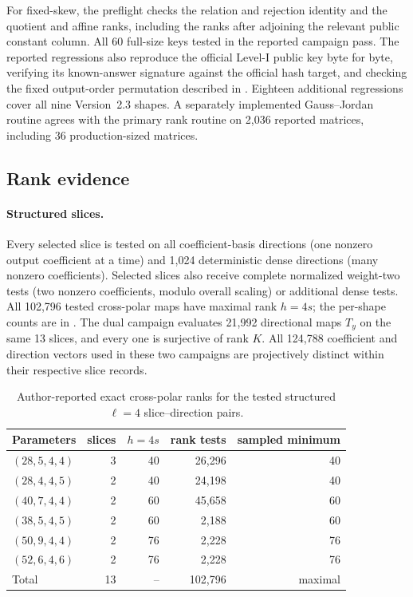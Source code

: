 \documentclass[11pt]{article}
\begin{document}
For fixed-skew, the preflight checks the relation and rejection identity and
the quotient and affine ranks, including the ranks after adjoining the
relevant public constant column.  All 60 full-size keys tested in the reported
campaign pass.  The
reported regressions also reproduce the official
Level-I public key byte for byte,
verifying its known-answer signature against the official hash target, and
checking the fixed output-order permutation described in
.  Eighteen additional regressions cover all nine
Version~2.3 shapes.  A separately implemented Gauss--Jordan routine agrees with
the primary rank routine on 2,036 reported matrices, including 36
production-sized matrices.

\subsection{Rank evidence}

\paragraph{Structured slices.}
Every selected slice is tested on all coefficient-basis directions (one
nonzero output coefficient at a time) and 1,024 deterministic dense directions
(many nonzero coefficients).  Selected slices also receive complete normalized
weight-two tests (two nonzero coefficients, modulo overall scaling) or
additional dense tests.  All 102,796 tested
cross-polar maps have maximal rank $h=4s$; the per-shape counts are in
.  The dual campaign evaluates 21,992 directional maps
$T_y$ on the same 13 slices, and every one is surjective of rank $K$.
All 124,788 coefficient and direction vectors used in these two campaigns are
projectively distinct within their respective slice records.

\begin{table}[tbp]
\centering
\caption{Author-reported exact cross-polar ranks for the tested structured
$\ell=4$ slice--direction pairs.}
\label{tab:cross-polar}
\small
\setlength{\tabcolsep}{5.2pt}
\begin{tabular}{@{}l r r r r@{}}
\toprule
Parameters & slices & $h=4s$ & rank tests & sampled minimum\\
\midrule
$(28,5,4,4)$  & 3 & 40 & 26,296 & 40\\
$(28,4,4,5)$  & 2 & 40 & 24,198 & 40\\
$(40,7,4,4)$  & 2 & 60 & 45,658 & 60\\
$(38,5,4,5)$  & 2 & 60 & 2,188  & 60\\
$(50,9,4,4)$  & 2 & 76 & 2,228  & 76\\
$(52,6,4,6)$  & 2 & 76 & 2,228  & 76\\
\midrule
Total          & 13 & -- & 102,796 & maximal\\
\bottomrule
\end{tabular}
\end{table}
\end{document}
